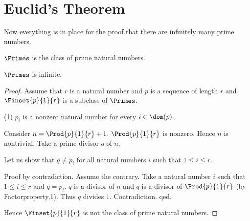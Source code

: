 \documentclass{stex}
\begin{document}
\section{Euclid's Theorem}

Now everything is in place for the proof that there
are infinitely many prime numbers.
\begin{forthel}

\begin{signature} $\Primes$ is the class of prime natural numbers.
\end{signature}



\begin{theorem}[Euclid]
$\Primes$ is infinite.
\end{theorem}
\begin{proof}
Assume that $r$ is a natural number and
$p$ is a sequence of length $r$ and
$\Finset{p}{1}{r}$ is a subclass of $\Primes$.

(1) $p_{i}$ is a nonzero natural number for every $i \in \dom(p)$.

Consider $n=\Prod{p}{1}{r}+1$.
$\Prod{p}{1}{r}$ is nonzero.
Hence $n$ is nontrivial. Take a prime divisor $q$ of $n$.

Let us show that $q \neq p_{i}$ for all natural numbers $i$ such that
$1 \leq i \leq r$.

Proof by contradiction.
Assume the contrary.
Take a natural number $i$ such that $1 \leq i \leq r$ and $q=p_{i}$.
$q$ is a divisor of $n$ and $q$ is a divisor of $\Prod{p}{1}{r}$
(by Factorproperty,1).
Thus $q$ divides $1$. Contradiction. qed.

Hence $\Finset{p}{1}{r}$ is not the class of prime natural numbers.
\end{proof}
\end{forthel}
\end{document}
